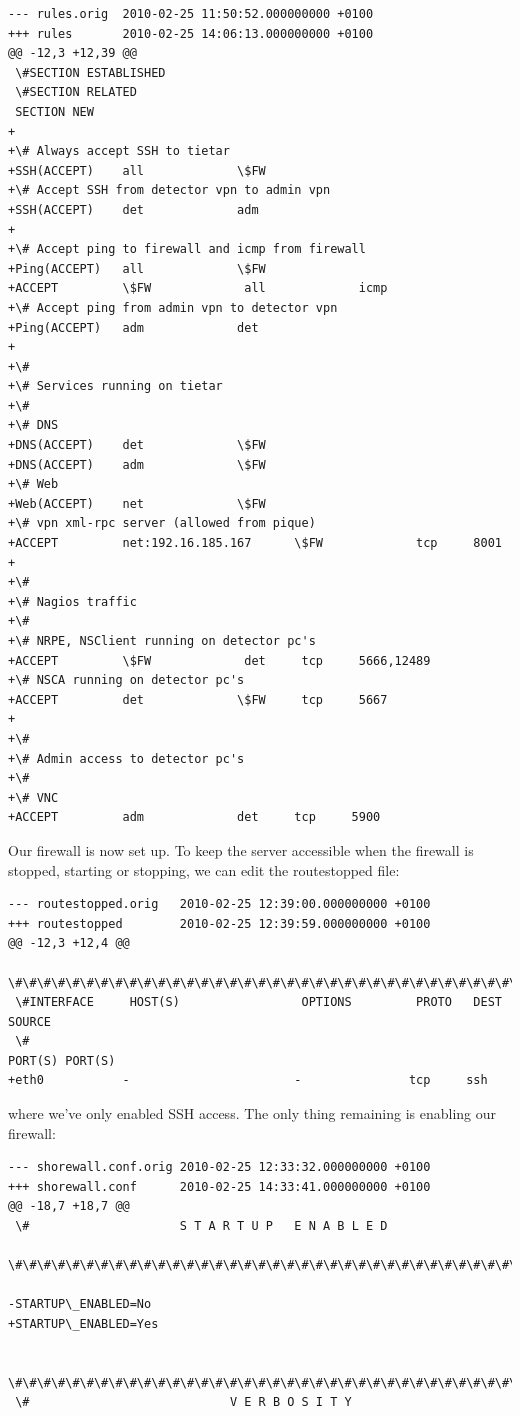\documentclass[a4paper,11pt,english]{sphinxmanual}
\begin{document}
\begin{Verbatim}[commandchars=\\\{\}]
--- rules.orig  2010-02-25 11:50:52.000000000 +0100
+++ rules       2010-02-25 14:06:13.000000000 +0100
@@ -12,3 +12,39 @@
 \#SECTION ESTABLISHED
 \#SECTION RELATED
 SECTION NEW
+
+\# Always accept SSH to tietar
+SSH(ACCEPT)    all             \$FW
+\# Accept SSH from detector vpn to admin vpn
+SSH(ACCEPT)    det             adm
+
+\# Accept ping to firewall and icmp from firewall
+Ping(ACCEPT)   all             \$FW
+ACCEPT         \$FW             all             icmp
+\# Accept ping from admin vpn to detector vpn
+Ping(ACCEPT)   adm             det
+
+\#
+\# Services running on tietar
+\#
+\# DNS
+DNS(ACCEPT)    det             \$FW
+DNS(ACCEPT)    adm             \$FW
+\# Web
+Web(ACCEPT)    net             \$FW
+\# vpn xml-rpc server (allowed from pique)
+ACCEPT         net:192.16.185.167      \$FW             tcp     8001
+
+\#
+\# Nagios traffic
+\#
+\# NRPE, NSClient running on detector pc's
+ACCEPT         \$FW             det     tcp     5666,12489
+\# NSCA running on detector pc's
+ACCEPT         det             \$FW     tcp     5667
+
+\#
+\# Admin access to detector pc's
+\#
+\# VNC
+ACCEPT         adm             det     tcp     5900
\end{Verbatim}

Our firewall is now set up.  To keep the server accessible when the firewall is stopped, starting or stopping, we can edit the routestopped file:

\begin{Verbatim}[commandchars=\\\{\}]
--- routestopped.orig   2010-02-25 12:39:00.000000000 +0100
+++ routestopped        2010-02-25 12:39:59.000000000 +0100
@@ -12,3 +12,4 @@
 \#\#\#\#\#\#\#\#\#\#\#\#\#\#\#\#\#\#\#\#\#\#\#\#\#\#\#\#\#\#\#\#\#\#\#\#\#\#\#\#\#\#\#\#\#\#\#\#\#\#\#\#\#\#\#\#\#\#\#\#\#\#\#\#\#\#\#\#\#\#\#\#\#\#\#\#\#\#\#
 \#INTERFACE     HOST(S)                 OPTIONS         PROTO   DEST    SOURCE
 \#                                                              PORT(S) PORT(S)
+eth0           -                       -               tcp     ssh
\end{Verbatim}

where we've only enabled SSH access.  The only thing remaining is enabling
our firewall:

\begin{Verbatim}[commandchars=\\\{\}]
--- shorewall.conf.orig 2010-02-25 12:33:32.000000000 +0100
+++ shorewall.conf      2010-02-25 14:33:41.000000000 +0100
@@ -18,7 +18,7 @@
 \#                     S T A R T U P   E N A B L E D
 \#\#\#\#\#\#\#\#\#\#\#\#\#\#\#\#\#\#\#\#\#\#\#\#\#\#\#\#\#\#\#\#\#\#\#\#\#\#\#\#\#\#\#\#\#\#\#\#\#\#\#\#\#\#\#\#\#\#\#\#\#\#\#\#\#\#\#\#\#\#\#\#\#\#\#\#\#\#\#

-STARTUP\_ENABLED=No
+STARTUP\_ENABLED=Yes

 \#\#\#\#\#\#\#\#\#\#\#\#\#\#\#\#\#\#\#\#\#\#\#\#\#\#\#\#\#\#\#\#\#\#\#\#\#\#\#\#\#\#\#\#\#\#\#\#\#\#\#\#\#\#\#\#\#\#\#\#\#\#\#\#\#\#\#\#\#\#\#\#\#\#\#\#\#\#\#
 \#                            V E R B O S I T Y
\end{Verbatim}
\end{document}
